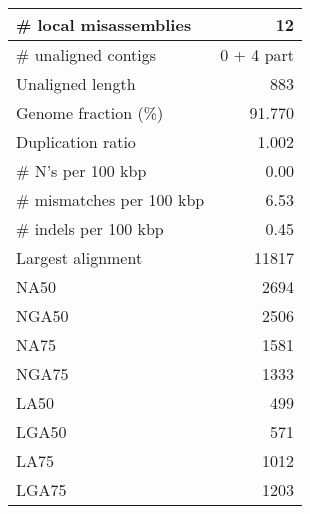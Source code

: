 \documentclass[12pt,a4paper]{article}
\begin{document}
\begin{table}[ht]
\begin{center}
\begin{tabular}{|l*{1}{|r}|}
\# local misassemblies & 12 \\ \hline
\# unaligned contigs & 0 + 4 part \\ \hline
Unaligned length & 883 \\ \hline
Genome fraction (\%) & 91.770 \\ \hline
Duplication ratio & 1.002 \\ \hline
\# N's per 100 kbp & 0.00 \\ \hline
\# mismatches per 100 kbp & 6.53 \\ \hline
\# indels per 100 kbp & 0.45 \\ \hline
Largest alignment & 11817 \\ \hline
NA50 & 2694 \\ \hline
NGA50 & 2506 \\ \hline
NA75 & 1581 \\ \hline
NGA75 & 1333 \\ \hline
LA50 & 499 \\ \hline
LGA50 & 571 \\ \hline
LA75 & 1012 \\ \hline
LGA75 & 1203 \\ \hline
\end{tabular}
\end{center}
\end{table}
\end{document}
